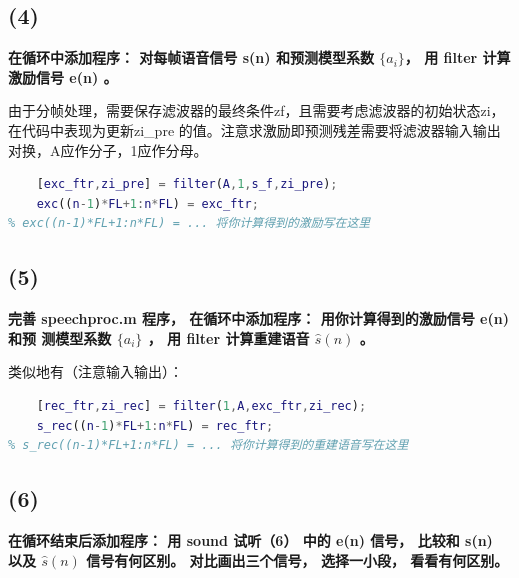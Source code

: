 \documentclass[10pt]{article}
\begin{document}
\subsection*{(4)}
\textbf{\color{gray}在循环中添加程序： 对每帧语音信号 s(n) 和预测模型系数 $\{a_i\} $， 用 filter 计算
激励信号 e(n) 。}

由于分帧处理，需要保存滤波器的最终条件zf，且需要考虑滤波器的初始状态zi，在代码中表现为更新zi\_pre
的值。注意求激励即预测残差需要将滤波器输入输出对换，A应作分子，1应作分母。
\begin{lstlisting}[language=matlab]
% (4) 在此位置写程序，用filter函数s_f计算激励，注意保持滤波器状态
    [exc_ftr,zi_pre] = filter(A,1,s_f,zi_pre);
    exc((n-1)*FL+1:n*FL) = exc_ftr;
% exc((n-1)*FL+1:n*FL) = ... 将你计算得到的激励写在这里
\end{lstlisting}
\subsection*{(5)}
\textbf{\color{gray}完善 speechproc.m 程序， 在循环中添加程序： 用你计算得到的激励信号 e(n) 和预
测模型系数 $\{a_i\} $ ， 用 filter 计算重建语音 $\hat{s}(n)$ 。}

类似地有（注意输入输出）：
\begin{lstlisting}[language=matlab]
% (5) 在此位置写程序，用filter函数和exc重建语音，注意保持滤波器状态
    [rec_ftr,zi_rec] = filter(1,A,exc_ftr,zi_rec);
    s_rec((n-1)*FL+1:n*FL) = rec_ftr;
% s_rec((n-1)*FL+1:n*FL) = ... 将你计算得到的重建语音写在这里
\end{lstlisting}

\subsection*{(6)}
\textbf{\color{gray}在循环结束后添加程序： 用 sound 试听（6） 中的 e(n) 信号， 比较和 s(n) 以及 $\hat{s}(n)$
信号有何区别。 对比画出三个信号， 选择一小段， 看看有何区别。}
\end{document}
